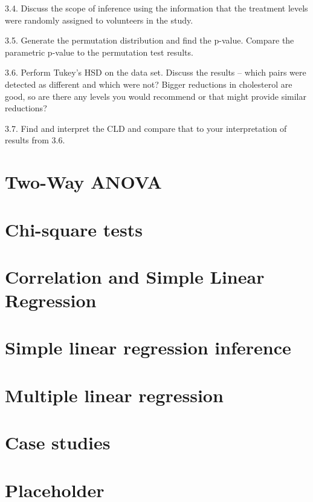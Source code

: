 \documentclass[]{book}
\theoremstyle{definition}
\theoremstyle{definition}
\theoremstyle{remark}
\begin{document}
3.4. Discuss the scope of inference using the information that the
treatment levels were randomly assigned to volunteers in the study.

3.5. Generate the permutation distribution and find the p-value. Compare
the parametric p-value to the permutation test results.

3.6. Perform Tukey's HSD on the data set. Discuss the results -- which
pairs were detected as different and which were not? Bigger reductions
in cholesterol are good, so are there any levels you would recommend or
that might provide similar reductions?

3.7. Find and interpret the CLD and compare that to your interpretation
of results from 3.6.

\chapter{Two-Way ANOVA}\label{chapter4}

\chapter{Chi-square tests}\label{chapter5}

\chapter{Correlation and Simple Linear Regression}\label{chapter6}

\chapter{Simple linear regression inference}\label{chapter7}

\chapter{Multiple linear regression}\label{chapter8}

\chapter{Case studies}\label{chapter9}

\chapter{Placeholder}\label{placeholder-2}


\end{document}
